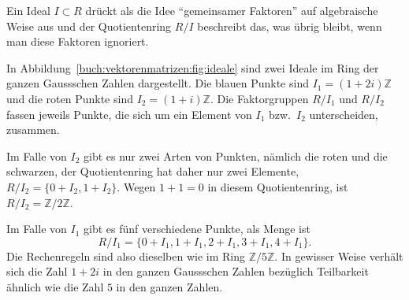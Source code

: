 Ein Ideal $I\subset R$ drückt als die Idee ``gemeinsamer Faktoren''
auf algebraische Weise aus und der Quotientenring $R/I$ beschreibt
das, was übrig bleibt, wenn man diese Faktoren ignoriert.

\begin{beispiel}
In Abbildung~\ref{buch:vektorenmatrizen:fig:ideale} sind zwei
Ideale im Ring der ganzen Gaussschen Zahlen dargestellt.
Die blauen Punkte sind $I_1=(1+2i)\mathbb{Z}$ und die roten Punkte sind
$I_2=(1+i)\mathbb{Z}$.
Die Faktorgruppen $R/I_1$ und $R/I_2$ fassen jeweils Punkte, die sich
um ein Element von $I_1$ bzw.~$I_2$ unterscheiden, zusammen.

Im Falle von $I_2$ gibt es nur zwei Arten von Punkten, nämlich
die roten und die schwarzen, der Quotientenring hat
daher nur zwei Elemente, $R/I_2 = \{0+I_2,1+I_2\}$.
Wegen $1+1=0$ in diesem Quotientenring, ist $R/I_2=\mathbb{Z}/2\mathbb{Z}$.

Im Falle von $I_1$ gibt es fünf verschiedene Punkte, als Menge ist
\[
R/I_1 
=
\{
0+I_1,
1+I_1,
2+I_1,
3+I_1,
4+I_1
\}.
\]
Die Rechenregeln sind also dieselben wie im Ring $\mathbb{Z}/5\mathbb{Z}$.
In gewisser Weise verhält sich die Zahl $1+2i$ in den ganzen 
Gaussschen Zahlen bezüglich Teilbarkeit ähnlich wie die Zahl $5$ in den
ganzen Zahlen.
\end{beispiel}

